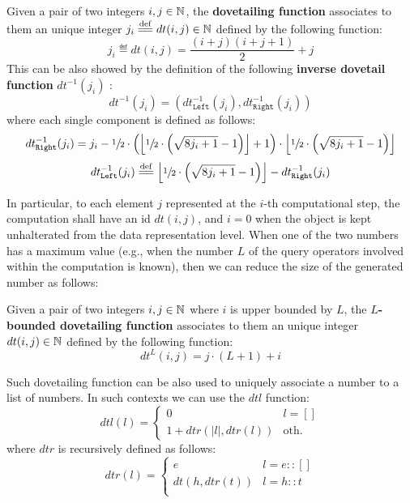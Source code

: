 \begin{definition}
Given a pair of two integers $i,j\in \mathbb{N}$, the \textbf{dovetailing function} associates to them an unique integer  $j_i\overset{\mathrm{def}}{=\mathrel{\mkern-3mu}=} dt(i,j)\in\mathbb{N}$ defined by the following function:
\[j_i\eqdef dt(i,j)=\frac{(i+j)(i+j+1)}{2}+j\]
This can be also showed by the definition of the following \textbf{inverse dovetail function} $dt^{-1}(j_i)$ \cite{bergami2014}:
\[dt^{-1}(j_i)=(dt_{\texttt{Left}}^{-1}(j_i),dt_{\texttt{Right}}^{-1}(j_i))\]
where each single component is defined as follows:
\[dt_{\texttt{Right}}^{-1}(j_i)= j_i - \sfrac{1}{2}\cdot\left(\left\lfloor\sfrac{1}{2}\cdot{\left(\sqrt{8j_i+1}-1\right)}\right\rfloor + 1\right)\cdot \left\lfloor\sfrac{1}{2}\cdot{\left(\sqrt{8j_i+1}-1\right)}\right\rfloor\]
\[dt_{\texttt{Left}}^{-1}(j_i) \overset{\mathrm{def}}{=\mathrel{\mkern-3mu}=} \left\lfloor\sfrac{1}{2}\cdot{\left(\sqrt{8j_i+1}-1\right)}\right\rfloor - dt_{\texttt{Right}}^{-1}(j_i)\]
\end{definition}



In particular, to each element $j$ represented at the $i$-th computational step, the computation shall have an id $dt(i,j)$, and $i=0$ when the object is kept unhalterated from the data representation level. When one of the two numbers has a maximum value (e.g., when the number $L$ of the query operators involved within the computation is known), then we can reduce the size of the generated number as follows:

\begin{definition}
	Given a pair of two integers $i,j\in \mathbb{N}$ where $i$ is upper bounded by $L$, the \textbf{$L$-bounded dovetailing function} associates to them an unique integer  $dt(i,j)\in\mathbb{N}$ defined by the following function:
	\[dt^L(i,j)=j\cdot(L+1)+i\]
\end{definition}

Such dovetailing function can be also used to uniquely associate a number to a list of numbers. In such contexts we can use the $dtl$ function: 
\begin{equation}\label{eq:dtl}
dtl(l)=\begin{cases}
0 & l = []\\
1+dtr(|l|,dtr(l)) & \textrm{oth.}
\end{cases}
\end{equation}
where $dtr$ is recursively defined as follows:
\[dtr(l)= \begin{cases}
e & l = e::[]\\
dt(h,dtr(t)) & l = h::t\\
\end{cases}\]

